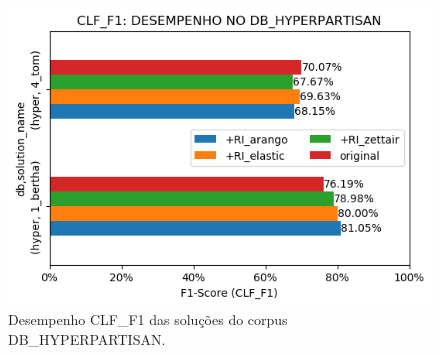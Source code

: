 \begin{figure}[h]
    \centering
    \caption{Desempenho CLF\_F1 das soluções do corpus DB\_HYPERPARTISAN.}
    \vspace{-0.5cm}
    \begin{center}
        \includegraphics[scale=0.75]{img/clf-f1-bars-hyperpartisan.png}
    \end{center}
    \vspace{-0.5cm}
    \label{fig:clf-f1-bars-hyperpartisan}
\end{figure}